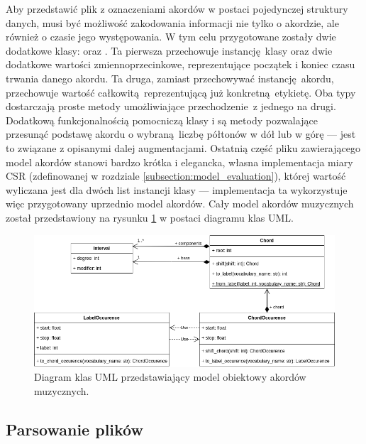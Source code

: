 Aby przedstawić plik z oznaczeniami akordów w postaci pojedynczej struktury danych, musi być możliwość zakodowania informacji nie tylko o akordzie, ale również o czasie jego występowania. W tym celu przygotowane zostały dwie dodatkowe klasy:  oraz . Ta pierwsza przechowuje instancję klasy  oraz dwie dodatkowe wartości zmiennoprzecinkowe, reprezentujące początek i koniec czasu trwania danego akordu. Ta druga, zamiast przechowywać instancję akordu, przechowuje wartość całkowitą reprezentującą już konkretną etykietę. Oba typy dostarczają proste metody umożliwiające przechodzenie z jednego na drugi. Dodatkową funkcjonalnością pomocniczą klasy  i  są metody pozwalające przesunąć podstawę akordu o wybraną liczbę półtonów w dół lub w górę --- jest to związane z opisanymi dalej augmentacjami. Ostatnią część pliku zawierającego model akordów stanowi bardzo krótka i elegancka, własna implementacja miary CSR (zdefinowanej w rozdziale \ref{subsection:model_evaluation}), której wartość wyliczana jest dla dwóch list instancji klasy  --- implementacja ta wykorzystuje więc przygotowany uprzednio model akordów.  Cały model akordów muzycznych został przedstawiony na rysunku \ref{fig:chord_model} w postaci diagramu klas UML.

\begin{figure}
    \centering
    \includegraphics[width=1.0\textwidth]{./images/chord_model.png}
    \caption{Diagram klas UML przedstawiający model obiektowy akordów muzycznych.}
    \label{fig:chord_model}
\end{figure}

\subsection{Parsowanie plików }

